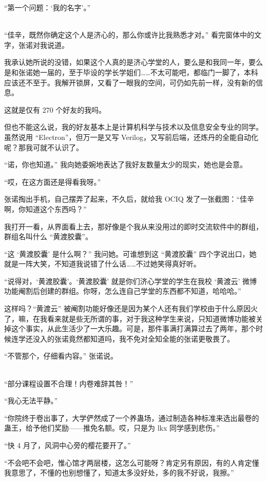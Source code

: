 \documentclass[UTF8]{ctexart}
\begin{document}
“第一个问题：‘我的名字’。”

~\\

“佳辛，既然你确定这个人是济心的，那么你或许比我熟悉才对。” 看完窗体中的文字，张诺对我说道。

我承认她所说的没错，如果这个人真的是济心学堂的人，要么是和我同一年，要么是和张诺她一届的，至于毕设的学长学姐们……不太可能吧，都临门一脚了，本科应该还不至于。我解开锁屏，又看了一眼我的空间，可仍如先前一样，没有新的信息。

这就是仅有 270 个好友的我吗。

但也不能这么说，我的好友基本上是计算机科学与技术以及信息安全专业的同学。虽然说用 “Electron”，但万一是又写 Verilog，又写前后端，还炼丹的全能自动化呢？那我可就不认识了。

“诺，你也知道。” 我向她委婉地表达了我好友数量太少的现实，她也是会意。

“哎，在这方面还是得看我呀。”

张诺掏出手机，自己摆弄了起来，不久后，就给我 OCIQ 发了一张截图：“佳辛啊，你知道这个东西吗？”

我打开一看，从界面看上去，那好像是个我从来没用过的即时交流软件中的群组，群组名叫什么 “黄渡胶囊”。

“这 ‘黄渡胶囊’ 是什么啊？” 我问她。可谁想到这 “黄渡胶囊” 四个字说出口，她就是一阵大笑，不知道我说错了什么话……不过她笑得真好听。

“说得对，‘黄渡胶囊’。‘黄渡胶囊’ 就是你们济心学堂的学生在我校 ‘黄渡云’ 微博功能阉割后创建的群组。你呀，怎么连自己学堂的东西都不知道，哈哈哈。”

这样吗？“黄渡云” 被阉割功能好像还是因为某个人还有我们学校由于什么原因火了，嘛，在我看来就是些无所谓的事，对于我这种学生来说，只知道微博功能被关掉这个事实，从此生活少了一大乐趣。可是，那件事满打满算过去了两年，那个时候连学还没入的张诺竟然都知道吗，我不免对全知全能的张诺更敬畏了。

“不管那个，仔细看内容。” 张诺说。

~\\

“部分课程设置不合理！内卷难辞其咎！”

“我心无法平静。”

“你院终于卷出事了，大学俨然成了一个养蛊场，通过制造各种标准来选出最卷的蛊王，给予他们奖励——推免名额。哎，只是为 lkx 同学感到悲伤。”

“快 4 月了，风洞中心旁的樱花要开了。”

“不会吧不会吧，惟心馆才两层楼，这怎么可能呀？肯定另有原因，有的人肯定懂我意思了，不懂的也别想懂了，知道太多没好处，多的我不好说，我擦。”
\end{document}
